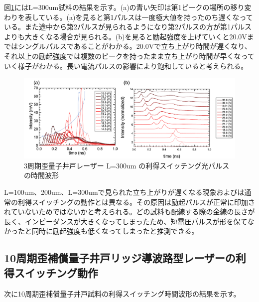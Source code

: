 {図\ref{fig:fig_3_2_3QW_ridge_L300_GS}にはL=300um試料の結果を示す。(a)の青い矢印は第1ピークの場所の移り変わりを表している。(a)を見ると第1パルスは一度極大値を持ったのち遅くなっている。また途中から第2パルスが見られるようになり第2パルスの方が第1パルスよりも大きくなる場合が見られる。(b)を見ると励起強度を上げていくと20.0Vまではシングルパルスであることがわかる。20.0Vで立ち上がり時間が遅くなり、それ以上の励起強度では複数のピークを持ったまま立ち上がり時間が早くなっていく様子がわかる。長い電流パルスの影響により飽和していると考えられる。
\begin{figure}[h]
	\centering
	\includegraphics[width=15cm]{figure/fig_3_2_3QW_ridge_L300_GS.png}
		\caption{3周期歪量子井戸レーザー L=300um の利得スイッチング光パルスの時間波形}
		\label{fig:fig_3_2_3QW_ridge_L300_GS}
\end{figure}


L=100um、200um、L=300umで見られた立ち上がりが遅くなる現象およびは通常の利得スイッチングの動作とは異なる。その原因は励起パルスが正常に印加されていないためではないかと考えられる。どの試料も配線する際の金線の長さが長く、インピーダンスが大きくなってしまったため、短電圧パルスが形を保てなかったと同時に励起強度も低くなってしまったと推測できる。
\clearpage
\subsection{10周期歪補償量子井戸リッジ導波路型レーザーの利得スイッチング動作}%
次に10周期歪補償量子井戸試料の利得スイッチング時間波形の結果を示す。

}
